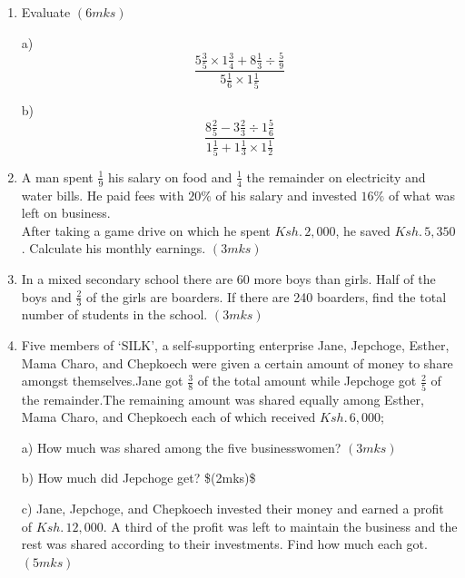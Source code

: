 \documentclass[
  letterpaper,
  DIV=11,
  numbers=noendperiod]{scrreprt}
\begin{document}
\begin{tcolorbox}
\begin{enumerate}
\def\labelenumi{\arabic{enumi}.}
\setcounter{enumi}{11}
\item
  Evaluate \hspace{12.8cm} \((6mks)\)

  a)
  \[\frac{5\frac{3}{5}\times 1\frac{3}{4}+8\frac{1}{3} \div \frac{5}{9}}{5\frac{1}{6}\times 1\frac{1}{5}}\]

  b)
  \[\frac{8\frac{2}{5}-3\frac{2}{3}\div 1\frac{5}{6}}{1\frac{1}{5}+ 1\frac{1}{3}\times 1\frac{1}{2}}\]
\item
  A man spent \(\frac{1}{9}\) his salary on food and \(\frac{1}{4}\) the
  remainder on electricity and water bills. He paid fees with \(20\%\)
  of his salary and invested \(16\%\) of what was left on business.\\
  After taking a game drive on which he spent \(Ksh. \,2,000\), he saved
  \(Ksh.\,5,350\). Calculate his monthly earnings. \((3mks)\)
\item
  In a mixed secondary school there are 60 more boys than girls. Half of
  the boys and \(\frac{2}{3}\) of the girls are boarders. If there are
  240 boarders, find the total number of students in the school.
  \hspace{14.2cm} \((3mks)\)
\item
  Five members of `SILK', a self-supporting enterprise Jane, Jepchoge,
  Esther, Mama Charo, and Chepkoech were given a certain amount of money
  to share amongst themselves.Jane got \(\frac{3}{8}\) of the total
  amount while Jepchoge got \(\frac{2}{5}\) of the remainder.The
  remaining amount was shared equally among Esther, Mama Charo, and
  Chepkoech each of which received \(Ksh.\, 6,000\);

  a) How much was shared among the five businesswomen? \hspace{4.3cm}
  \((3mks)\)

  b) How much did Jepchoge get? \hspace{8.5cm} \$(2mks)\$

  c) Jane, Jepchoge, and Chepkoech invested their money and earned a
  profit of \(Ksh.\, 12,000\). A third of the profit was left to
  maintain the business and the rest was shared according to their
  investments. Find how much each got.\hspace{6.5cm} \((5mks)\)
\end{enumerate}

\end{tcolorbox}

\end{document}
